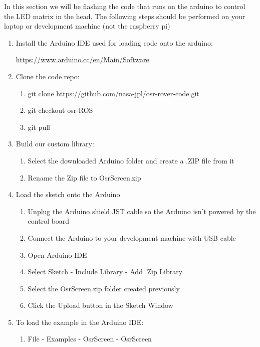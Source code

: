 \documentclass{article}
\begin{document}
In this section we will be flashing the code that runs on the arduino to control the LED matrix in the head. The following steps should be performed on your laptop or development machine (not the raspberry pi)

\begin{enumerate} 
\item Install the Arduino IDE used for loading code onto the arduino:

	\href{https://www.arduino.cc/en/Main/Software}{https://www.arduino.cc/en/Main/Software}

\item Clone the code repo:
	\begin{enumerate}
	\item git clone https://github.com/nasa-jpl/osr-rover-code.git
	\item git checkout osr-ROS
	\item git pull
	\end{enumerate}

\item Build our custom library:
	\begin{enumerate}
	\item Select the downloaded Arduino folder and create a .ZIP file from it
	\item Rename the Zip file to OsrScreen.zip
	\end{enumerate}

\item Load the sketch onto the Arduino
	\begin{enumerate}
	\item Unplug the Arduino shield JST cable so the Arduino isn't powered by the control board
	\item Connect the Arduino to your development machine with USB cable
	\item Open Arduino IDE
	\item Select Sketch - Include Library - Add .Zip Library 
	\item Select the OsrScreen.zip folder created previously
	\item Click the Upload button in the Sketch Window	
	\end{enumerate}

\item To load the example in the Arduino IDE: 
	\begin{enumerate}
	\item File - Examples - OsrScreen - OsrScreen 
	\end{enumerate}

\end{enumerate}
\end{document}
